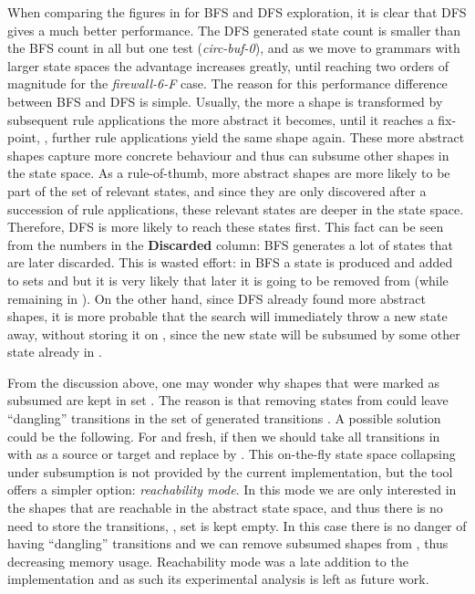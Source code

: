 When comparing the figures in  for BFS and DFS exploration, it is
clear that DFS gives a much better performance. The DFS generated state count is
smaller than the BFS count in all but one test (\emph{circ-buf-0}), and as we
move to grammars with larger state spaces the advantage increases greatly, until
reaching two orders of magnitude for the \emph{firewall-6-F} case. The reason
for this performance difference between BFS and DFS is simple. Usually, the more
a shape is transformed by subsequent rule applications the more abstract it
becomes, until it reaches a fix-point, \ie, further rule applications yield the
same shape again. These more abstract shapes capture more concrete behaviour
and thus can subsume other shapes in the state space. As a rule-of-thumb, more
abstract shapes are more likely to be part of the set of relevant states, and
since they are only discovered after a succession of rule applications, these
relevant states are deeper in the state space. Therefore, DFS is more likely to
reach these states first. This fact can be seen from the numbers in the {\bf
Discarded} column: BFS generates a lot of states that are later discarded. This
is wasted effort: in BFS a state is produced and added to sets  and  but
it is very likely that later it is going to be removed from  (while remaining
in ). On the other hand, since DFS already found more abstract shapes, it is
more probable that the search will immediately throw a new state away, without
storing it on , since the new state will be subsumed by some other state
already in .

From the discussion above, one may wonder why shapes that were marked as
subsumed are kept in set . The reason is that removing states from  could
leave ``dangling'' transitions in the set of generated transitions . A
possible solution could be the following. For  and  fresh, if  then we should take all transitions in  with  as a source or
target and replace  by . This on-the-fly state space collapsing under
subsumption is not provided by the current implementation, but the tool offers
a simpler option: \emph{reachability mode}. In this mode we are only interested
in the shapes that are reachable in the abstract state space, and thus there is
no need to store the transitions, \ie, set  is kept empty. In this case there
is no danger of having ``dangling'' transitions and we can remove subsumed
shapes from , thus decreasing memory usage. Reachability mode was a late
addition to the implementation and as such its experimental analysis is left as
future work.

